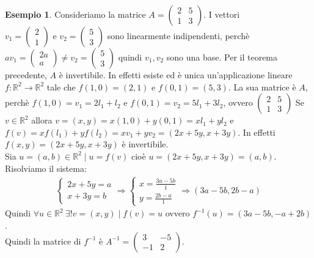 \documentclass[a4paper]{article}
\theoremstyle{definition}
\newtheorem*{es}{Esempio}
\begin{document}
\begin{es}
	Consideriamo la matrice $A = \begin{pmatrix}
			2 & 5 \\
			1 & 3
		\end{pmatrix}$. I vettori $v_1 = \begin{pmatrix}
			2 \\
			1
		\end{pmatrix} \text{ e } v_2 = \begin{pmatrix}
			5 \\
			3
		\end{pmatrix}$ sono linearmente indipendenti, perchè $av_1 = \begin{pmatrix}
			2a \\
			a
		\end{pmatrix} \neq v_2 = \begin{pmatrix}
			5 \\
			3
		\end{pmatrix}$ quindi $v_1, v_2$ sono una base.
	Per il teorema precedente, $A$ è invertibile.
	In effetti esiste ed è unica un'applicazione lineare $f: \mathbb{R}^2 \rightarrow \mathbb{R}^2$ tale che $f(1, 0) = (2, 1)$ e $f(0, 1) = (5, 3)$.
	La sua matrice è $A$, perchè $f(1, 0) = v_1 = 2 l_1 + l_2$ e $f(0, 1) = v_2 = 5l_1 + 3l_2$, ovvero $\begin{pmatrix}
			2 & 5 \\
			1 & 3
		\end{pmatrix}$
	Se $v \in \mathbb{R}^2$ allora $v = (x, y) = x(1, 0) + y(0, 1) = xl_1 + yl_2$ e $f(v) = xf(l_1) + yf(l_2) = xv_1 + yv_2 = (2x + 5y, x + 3y)$.
	In effetti $f(x, y) = (2x + 5y, x + 3y)$ è invertibile. \\
	Sia $u = (a, b) \in \mathbb{R}^2 \mid u = f(v)$ cioè $u = (2x + 5y, x + 3y) = (a, b)$. Risolviamo il sistema:
	\begin{align*}
		\begin{cases}
			2x + 5y = a \\
			x + 3y = b
		\end{cases} \Rightarrow \begin{cases}
			                        x = \frac{3a - 5b}{1} \\
			                        y = \frac{2b - a}{1}
		                        \end{cases} \Rightarrow (3a - 5b, 2b - a)
	\end{align*}
	Quindi $\forall u \in \mathbb{R}^2 \ \exists! v = (x, y) \mid f(v) = u$ ovvero $f^{-1}(u) = (3a - 5b, -a + 2b)$. \\
	Quindi la matrice di $f^{-1}$ è $A^{-1} = \begin{pmatrix}
			3  & -5 \\
			-1 & 2
		\end{pmatrix}$.
\end{es}
\end{document}
